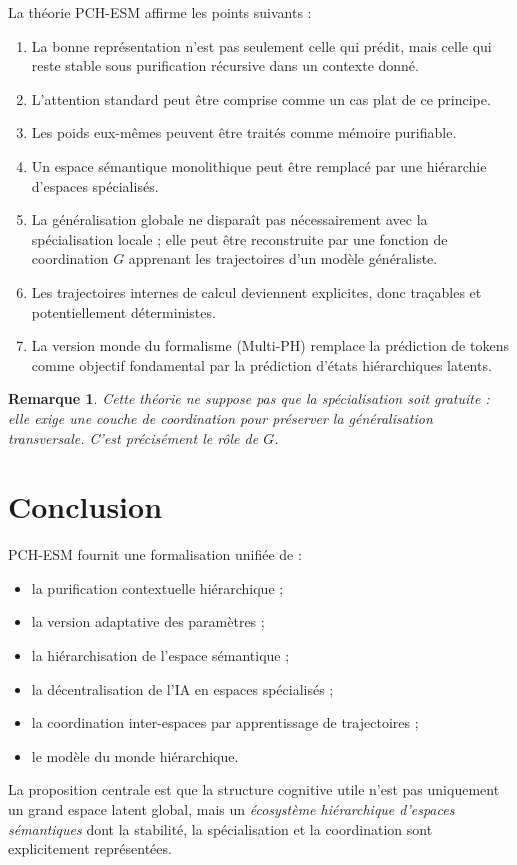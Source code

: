 \documentclass[11pt,a4paper]{article}
\newtheorem{remark}{Remarque}[section]
\newcommand{\1}{\mathbf 1}
\begin{document}
La théorie PCH-ESM affirme les points suivants :

\begin{enumerate}[leftmargin=2em]
    \item La bonne représentation n'est pas seulement celle qui prédit, mais celle qui reste stable sous purification récursive dans un contexte donné.
    \item L'attention standard peut être comprise comme un cas plat de ce principe.
    \item Les poids eux-mêmes peuvent être traités comme mémoire purifiable.
    \item Un espace sémantique monolithique peut être remplacé par une hiérarchie d'espaces spécialisés.
    \item La généralisation globale ne disparaît pas nécessairement avec la spécialisation locale ; elle peut être reconstruite par une fonction de coordination \(G\) apprenant les trajectoires d'un modèle généraliste.
    \item Les trajectoires internes de calcul deviennent explicites, donc traçables et potentiellement déterministes.
    \item La version monde du formalisme (Multi-PH) remplace la prédiction de tokens comme objectif fondamental par la prédiction d'états hiérarchiques latents.
\end{enumerate}

\begin{remark}
Cette théorie ne suppose pas que la spécialisation soit gratuite : elle exige une couche de coordination pour préserver la généralisation transversale.
C'est précisément le rôle de \(G\).
\end{remark}

\section{Conclusion}

PCH-ESM fournit une formalisation unifiée de :
\begin{itemize}[leftmargin=2em]
    \item la purification contextuelle hiérarchique ;
    \item la version adaptative des paramètres ;
    \item la hiérarchisation de l'espace sémantique ;
    \item la décentralisation de l'IA en espaces spécialisés ;
    \item la coordination inter-espaces par apprentissage de trajectoires ;
    \item le modèle du monde hiérarchique.
\end{itemize}

La proposition centrale est que la structure cognitive utile n'est pas uniquement un grand espace latent global, mais un \emph{écosystème hiérarchique d'espaces sémantiques} dont la stabilité, la spécialisation et la coordination sont explicitement représentées.
\end{document}
